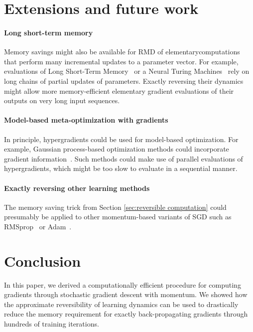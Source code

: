 \documentclass{article}
\newcommand{\primal}{elementary}
\begin{document}
\section{Extensions and future work}

\paragraph{Long short-term memory}
Memory savings might also be available for RMD of \primal computations that perform many incremental updates to a parameter vector. %
For example, evaluations of Long Short-Term Memory~\citep{hochreiter1997long} or a Neural Turing Machines~\citep{graves2014neural} rely on long chains of partial updates of parameters.
Exactly reversing their dynamics might allow more memory-efficient \primal{} gradient evaluations of their outputs on very long input sequences. %

\paragraph{Model-based meta-optimization with gradients}
In principle, hypergradients could be used for model-based optimization.
For example, Gaussian process-based optimization methods could incorporate gradient information~\cite{solak2003derivative}.
Such methods could make use of parallel evaluations of hypergradients, which might be too slow to evaluate in a sequential manner.

\paragraph{Exactly reversing other learning methods}
The memory saving trick from Section \ref{sec:reversible computation} could presumably be applied to other momentum-based variants of SGD such as RMSprop~\cite{Tieleman2012} or Adam~\citep{Adam14}.


\section{Conclusion}

In this paper, we derived a computationally efficient procedure for computing gradients through stochastic gradient descent with momentum.
We showed how the approximate reversibility of learning dynamics can be used to drastically reduce the memory requirement for exactly back-propagating gradients through hundreds of training iterations.
\end{document}
